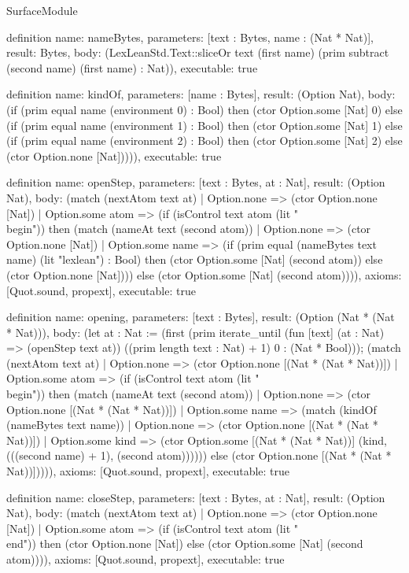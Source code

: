 \begin{lexlean}{SurfaceModule}
\begin{semanticmodule}
definition{
  name: nameBytes,
  parameters: [text : Bytes, name : (Nat * Nat)],
  result: Bytes,
  body: (LexLeanStd.Text::sliceOr text (first name) (prim subtract (second name) (first name) : Nat)),
  executable: true
}

definition{
  name: kindOf,
  parameters: [name : Bytes],
  result: (Option Nat),
  body: (if (prim equal name (environment 0) : Bool) then (ctor Option.some [Nat] 0) else (if (prim equal name (environment 1) : Bool) then (ctor Option.some [Nat] 1) else (if (prim equal name (environment 2) : Bool) then (ctor Option.some [Nat] 2) else (ctor Option.none [Nat])))),
  executable: true
}

definition{
  name: openStep,
  parameters: [text : Bytes, at : Nat],
  result: (Option Nat),
  body: (match (nextAtom text at)
    | Option.none => (ctor Option.none [Nat])
    | Option.some atom => (if (isControl text atom (lit "\\begin")) then (match (nameAt text (second atom))
      | Option.none => (ctor Option.none [Nat])
      | Option.some name => (if (prim equal (nameBytes text name) (lit "lexlean") : Bool) then (ctor Option.some [Nat] (second atom)) else (ctor Option.none [Nat]))) else (ctor Option.some [Nat] (second atom)))),
  axioms: [Quot.sound, propext],
  executable: true
}

definition{
  name: opening,
  parameters: [text : Bytes],
  result: (Option (Nat * (Nat * Nat))),
  body: (let at : Nat := (first (prim iterate_until (fun [text] (at : Nat) => (openStep text at)) ((prim length text : Nat) + 1) 0 : (Nat * Bool))); (match (nextAtom text at)
    | Option.none => (ctor Option.none [(Nat * (Nat * Nat))])
    | Option.some atom => (if (isControl text atom (lit "\\begin")) then (match (nameAt text (second atom))
      | Option.none => (ctor Option.none [(Nat * (Nat * Nat))])
      | Option.some name => (match (kindOf (nameBytes text name))
        | Option.none => (ctor Option.none [(Nat * (Nat * Nat))])
        | Option.some kind => (ctor Option.some [(Nat * (Nat * Nat))] (kind, (((second name) + 1), (second atom)))))) else (ctor Option.none [(Nat * (Nat * Nat))])))),
  axioms: [Quot.sound, propext],
  executable: true
}

definition{
  name: closeStep,
  parameters: [text : Bytes, at : Nat],
  result: (Option Nat),
  body: (match (nextAtom text at)
    | Option.none => (ctor Option.none [Nat])
    | Option.some atom => (if (isControl text atom (lit "\\end")) then (ctor Option.none [Nat]) else (ctor Option.some [Nat] (second atom)))),
  axioms: [Quot.sound, propext],
  executable: true
}


\end{semanticmodule}
\end{lexlean}

